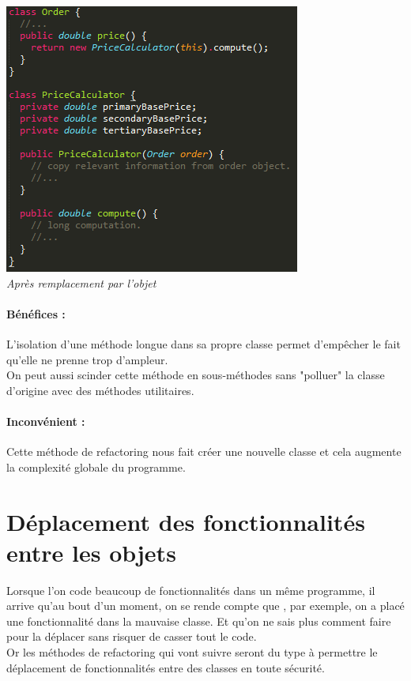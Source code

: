 \documentclass[a4paper,twoside,12pt,openright]{report}
\begin{document}
\begin{center}
\includegraphics[scale=1]{Image/MethodeToObjet2.png}\\
\itshape{Après remplacement par l'objet \cite{ref5}}
\end{center}

\paragraph{Bénéfices :}
L'isolation d'une méthode longue dans sa propre classe permet d'empêcher le fait qu'elle ne prenne trop d'ampleur.\\
On peut aussi scinder cette méthode en sous-méthodes sans "polluer" la classe d'origine avec des méthodes utilitaires.

\paragraph{Inconvénient :}
Cette méthode de refactoring nous fait créer une nouvelle classe et cela augmente la complexité globale du programme.\\

\newpage

\section{Déplacement des fonctionnalités entre les objets}
Lorsque l'on code beaucoup de fonctionnalités dans un même programme, il arrive qu'au bout d'un moment, on se rende compte que , par exemple, on a placé une fonctionnalité dans la mauvaise classe. Et qu'on ne sais plus comment faire pour la déplacer sans risquer de casser tout le code.\\
Or les méthodes de refactoring qui vont suivre seront du type à permettre le déplacement de fonctionnalités entre des classes en toute sécurité.\\
\end{document}
